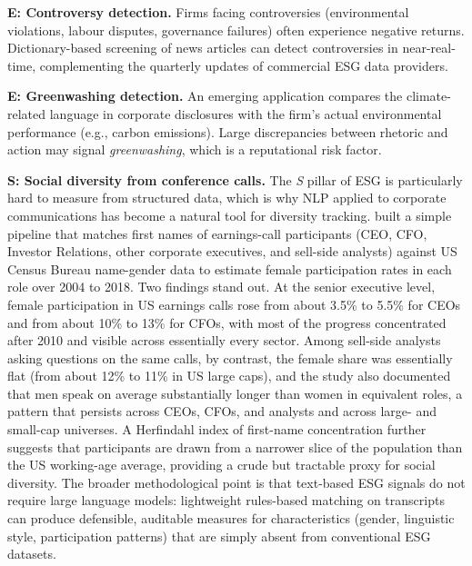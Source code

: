 \textbf{E: Controversy detection.} Firms facing controversies (environmental violations, labour disputes, governance failures) often experience negative returns. Dictionary-based screening of news articles can detect controversies in near-real-time, complementing the quarterly updates of commercial ESG data providers.

\textbf{E: Greenwashing detection.} An emerging application compares the climate-related language in corporate disclosures with the firm's actual environmental performance (e.g., carbon emissions). Large discrepancies between rhetoric and action may signal \textit{greenwashing}, which is a reputational risk factor.

\textbf{S: Social diversity from conference calls.} The \textit{S} pillar of ESG is particularly hard to measure from structured data, which is why NLP applied to corporate communications has become a natural tool for diversity tracking. \cite{ions2019diversity} built a simple pipeline that matches first names of earnings-call participants (CEO, CFO, Investor Relations, other corporate executives, and sell-side analysts) against US Census Bureau name-gender data to estimate female participation rates in each role over 2004 to 2018. Two findings stand out. At the senior executive level, female participation in US earnings calls rose from about 3.5\% to 5.5\% for CEOs and from about 10\% to 13\% for CFOs, with most of the progress concentrated after 2010 and visible across essentially every sector. Among sell-side analysts asking questions on the same calls, by contrast, the female share was essentially flat (from about 12\% to 11\% in US large caps), and the study also documented that men speak on average substantially longer than women in equivalent roles, a pattern that persists across CEOs, CFOs, and analysts and across large- and small-cap universes. A Herfindahl index of first-name concentration further suggests that participants are drawn from a narrower slice of the population than the US working-age average, providing a crude but tractable proxy for social diversity. The broader methodological point is that text-based ESG signals do not require large language models: lightweight rules-based matching on transcripts can produce defensible, auditable measures for characteristics (gender, linguistic style, participation patterns) that are simply absent from conventional ESG datasets.


